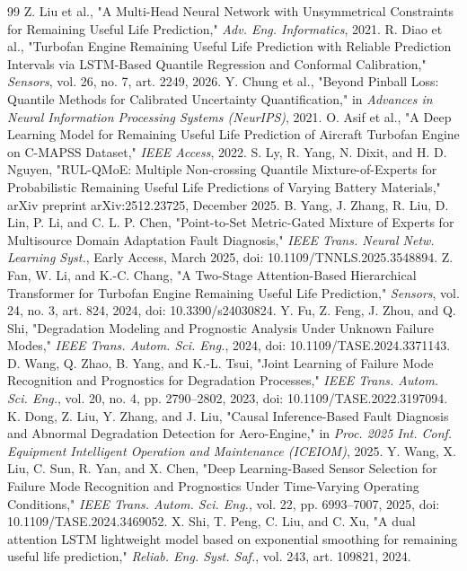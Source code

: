 \documentclass[preprint,10pt]{elsarticle}
\begin{document}
\begin{thebibliography}{99}
  Z. Liu et al., "A Multi-Head Neural Network with Unsymmetrical Constraints for Remaining Useful Life Prediction," \textit{Adv. Eng. Informatics}, 2021.
  R. Diao et al., "Turbofan Engine Remaining Useful Life Prediction with Reliable Prediction Intervals via LSTM-Based Quantile Regression and Conformal Calibration," \textit{Sensors}, vol. 26, no. 7, art. 2249, 2026.
  Y. Chung et al., "Beyond Pinball Loss: Quantile Methods for Calibrated Uncertainty Quantification," in \textit{Advances in Neural Information Processing Systems (NeurIPS)}, 2021.
  O. Asif et al., "A Deep Learning Model for Remaining Useful Life Prediction of Aircraft Turbofan Engine on C-MAPSS Dataset," \textit{IEEE Access}, 2022.
  S. Ly, R. Yang, N. Dixit, and H. D. Nguyen, "RUL-QMoE: Multiple Non-crossing Quantile Mixture-of-Experts for Probabilistic Remaining Useful Life Predictions of Varying Battery Materials," arXiv preprint arXiv:2512.23725, December 2025.
  B. Yang, J. Zhang, R. Liu, D. Lin, P. Li, and C. L. P. Chen, "Point-to-Set Metric-Gated Mixture of Experts for Multisource Domain Adaptation Fault Diagnosis," \textit{IEEE Trans. Neural Netw. Learning Syst.}, Early Access, March 2025, doi: 10.1109/TNNLS.2025.3548894.
  Z. Fan, W. Li, and K.-C. Chang, "A Two-Stage Attention-Based Hierarchical Transformer for Turbofan Engine Remaining Useful Life Prediction," \textit{Sensors}, vol. 24, no. 3, art. 824, 2024, doi: 10.3390/s24030824.
  Y. Fu, Z. Feng, J. Zhou, and Q. Shi, "Degradation Modeling and Prognostic Analysis Under Unknown Failure Modes," \textit{IEEE Trans. Autom. Sci. Eng.}, 2024, doi: 10.1109/TASE.2024.3371143.
  D. Wang, Q. Zhao, B. Yang, and K.-L. Tsui, "Joint Learning of Failure Mode Recognition and Prognostics for Degradation Processes," \textit{IEEE Trans. Autom. Sci. Eng.}, vol. 20, no. 4, pp. 2790--2802, 2023, doi: 10.1109/TASE.2022.3197094.
  K. Dong, Z. Liu, Y. Zhang, and J. Liu, "Causal Inference-Based Fault Diagnosis and Abnormal Degradation Detection for Aero-Engine," in \textit{Proc. 2025 Int. Conf. Equipment Intelligent Operation and Maintenance (ICEIOM)}, 2025.
  Y. Wang, X. Liu, C. Sun, R. Yan, and X. Chen, "Deep Learning-Based Sensor Selection for Failure Mode Recognition and Prognostics Under Time-Varying Operating Conditions," \textit{IEEE Trans. Autom. Sci. Eng.}, vol. 22, pp. 6993--7007, 2025, doi: 10.1109/TASE.2024.3469052.
  X. Shi, T. Peng, C. Liu, and C. Xu, "A dual attention LSTM lightweight model based on exponential smoothing for remaining useful life prediction," \textit{Reliab. Eng. Syst. Saf.}, vol. 243, art. 109821, 2024.

\end{thebibliography}
\end{document}
